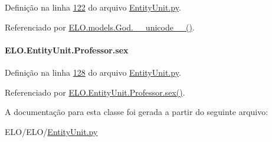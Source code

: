 Definição na linha \hyperlink{EntityUnit_8py_source_l00122}{122} do arquivo \hyperlink{EntityUnit_8py_source}{Entity\+Unit.\+py}.



Referenciado por \hyperlink{classELO_1_1models_1_1God_ad885cef3d586b18dd3639ebf3bfd66eb}{E\+L\+O.\+models.\+God.\+\_\+\+\_\+unicode\+\_\+\+\_\+()}.

\hypertarget{classELO_1_1EntityUnit_1_1Professor_ac049dc360c4af27037158e33577288e1}{}
\paragraph[{sex}]{\setlength{\rightskip}{0pt plus 5cm}E\+L\+O.\+Entity\+Unit.\+Professor.\+sex}\label{classELO_1_1EntityUnit_1_1Professor_ac049dc360c4af27037158e33577288e1}


Definição na linha \hyperlink{EntityUnit_8py_source_l00128}{128} do arquivo \hyperlink{EntityUnit_8py_source}{Entity\+Unit.\+py}.



Referenciado por \hyperlink{classELO_1_1EntityUnit_1_1Professor_a400ccf21f0d981e6a61e694403316a52}{E\+L\+O.\+Entity\+Unit.\+Professor.\+sex()}.



A documentação para esta classe foi gerada a partir do seguinte arquivo\+:\begin{DoxyCompactItemize}
\item 
E\+L\+O/\+E\+L\+O/\hyperlink{EntityUnit_8py}{Entity\+Unit.\+py}\end{DoxyCompactItemize}
